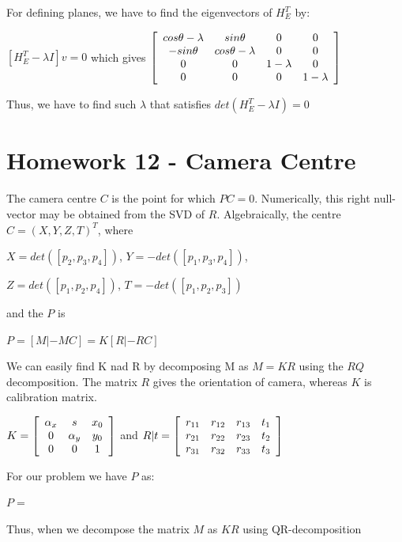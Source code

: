 \documentclass[]{article}
\begin{document}
For defining planes, we have to find the eigenvectors of $H_E^T$ by:

\centerline {
	$[H_E^T - \lambda I]v = 0 $ which gives $\left[ {\begin{array}{*{20}c}
		cos \theta - \lambda & sin \theta & 0 & 0 \\
		-sin \theta & cos \theta - \lambda & 0 & 0 \\ 
		0 & 0 & 1 - \lambda & 0 \\ 
		0 & 0 & 0 & 1 - \lambda   
		\end{array} } \right] $
}

Thus, we have to find such $\lambda$ that satisfies $det(H_E^T - \lambda I) = 0$

\section{Homework 12 - Camera Centre }

The camera centre $C$ is the point for which $PC = 0$. Numerically, this right null-vector may be obtained from the SVD of $R$. Algebraically, the centre $C = (X, Y,Z,T)^T$, where 

\centerline {
	$X=det([p_2, p_3, p_4])$, $Y=-det([p_1, p_3, p_4])$, 
}

\centerline {
	$Z=det([p_1, p_2, p_4])$, $T=-det([p_1, p_2, p_3])$
}

and the $P$ is 

\centerline {
	$P=[M | -MC] = K[R | -RC ]$
}

We can easily find K nad R by decomposing M as $M = KR$ using the $RQ$ decomposition. The matrix $R$ gives the orientation of camera, whereas $K$ is calibration matrix. 

\centerline {
		$K = \left[ {\begin{array}{*{20}c}
		\alpha _x & s & x_0\\
		0 & \alpha _y & y_0 \\ 
		0 & 0 & 1   
		\end{array} } \right]$ and $R|t = \left[ {\begin{array}{*{20}c}
		r_{11} & r_{12} & r_{13} & t_1 \\
		r_{21} & r_{22} & r_{23} & t_2 \\ 
		r_{31} & r_{32} & r_{33} & t_3    
		\end{array} } \right]$
}

For our problem we have $P$ as:

\centerline {
	$P = $
}

Thus, when we decompose the matrix $M$ as $KR$ using QR-decomposition 
\end{document}
